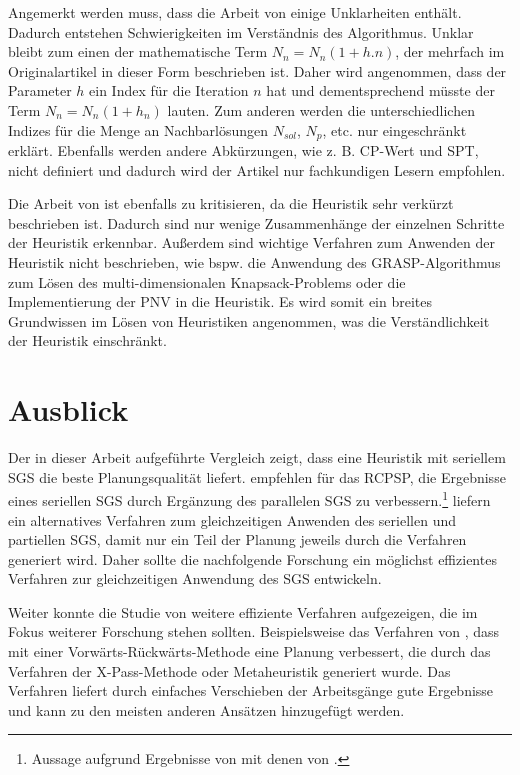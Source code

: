 \documentclass[a4paper,12pt,normalheadings,footexclude,headinclude,liststotoc,nochapterprefix,onecolumn,oneside,parskip,pointlessnumbers]{scrreprt}
\begin{document}
Angemerkt werden muss, dass die Arbeit von \cite{bouleimen2003new} einige Unklarheiten enthält. Dadurch entstehen Schwierigkeiten im Verständnis des Algorithmus. Unklar bleibt zum einen der mathematische Term $N_{n}=N_{n}(1+h.n)$, der mehrfach im Originalartikel in dieser Form beschrieben ist. Daher wird angenommen, dass der Parameter $h$ ein Index für die Iteration $n$ hat und dementsprechend müsste der Term $N_{n}=N_{n}(1+h_{n})$ lauten. Zum anderen werden die unterschiedlichen Indizes für die Menge an Nachbarlösungen $N_{sol}$, $N_{p}$, etc. nur eingeschränkt erklärt. Ebenfalls werden andere Abkürzungen, wie z. B. CP-Wert und SPT, nicht definiert und dadurch wird der Artikel nur fachkundigen Lesern empfohlen. 

Die Arbeit von \cite{kochetov2003evolutionary} ist ebenfalls zu kritisieren, da die Heuristik sehr verkürzt beschrieben ist. Dadurch sind nur wenige Zusammenhänge der einzelnen Schritte der Heuristik erkennbar. Außerdem sind wichtige Verfahren zum Anwenden der Heuristik nicht beschrieben, wie bspw. die Anwendung des GRASP-Algorithmus zum Lösen des multi-dimensionalen Knapsack-Problems oder die Implementierung der PNV in die Heuristik. Es wird somit ein breites Grundwissen im Lösen von Heuristiken angenommen, was die Verständlichkeit der Heuristik einschränkt.

\section{Ausblick}
Der in dieser Arbeit aufgeführte Vergleich zeigt, dass eine Heuristik mit seriellem SGS die beste Planungsqualität liefert. %
\cite{kolisch2006experimental} empfehlen für das RCPSP, die Ergebnisse eines seriellen SGS durch Ergänzung des parallelen SGS zu verbessern.\footnote{Aussage aufgrund Ergebnisse von \cite{hartmann2002self} mit denen von \cite{hartmann1998competitive}.} \cite{kochetov2003evolutionary} liefern ein alternatives Verfahren zum gleichzeitigen Anwenden des seriellen und partiellen SGS, damit nur ein Teil der Planung jeweils durch die Verfahren generiert wird. Daher sollte die nachfolgende Forschung ein möglichst effizientes Verfahren zur gleichzeitigen Anwendung des SGS entwickeln.


Weiter konnte die Studie von \cite{kolisch2006experimental} weitere effiziente Verfahren aufgezeigen, die im Fokus weiterer Forschung stehen sollten. Beispielsweise das Verfahren von \cite{tormos2001competitive}, dass mit einer Vorwärts-Rückwärts-Methode eine Planung verbessert, die durch das Verfahren der X-Pass-Methode oder Metaheuristik generiert wurde. Das Verfahren liefert durch einfaches Verschieben der Arbeitsgänge gute Ergebnisse und kann zu den meisten anderen Ansätzen hinzugefügt werden. %
\end{document}
